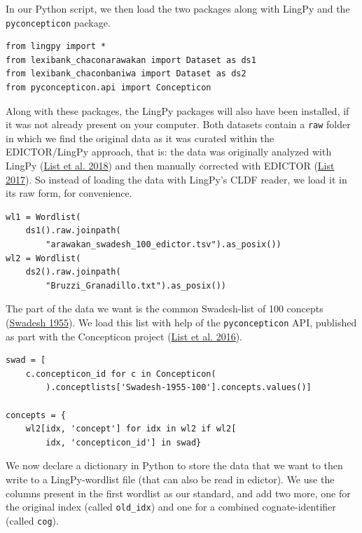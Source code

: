 \documentclass[
  a4paper,
  14pt,
  oneside,
  tablecaptionabove
]{scrbook}
\begin{document}
In our Python script, we then load the two packages along with LingPy
and the \lstinline!pyconcepticon! package.

\begin{lstlisting}
from lingpy import *
from lexibank_chaconarawakan import Dataset as ds1
from lexibank_chaconbaniwa import Dataset as ds2
from pyconcepticon.api import Concepticon
\end{lstlisting}

Along with these packages, the LingPy packages will also have been
installed, if it was not already present on your computer. Both datasets
contain a \lstinline!raw! folder in which we find the original data as
it was curated within the EDICTOR/LingPy approach, that is: the data was
originally analyzed with LingPy (\href{http://bibliography.lingpy.org?key=List2018i}{List et al. 2018})
and then manually corrected with EDICTOR (\href{http://bibliography.lingpy.org?key=List2017d}{List 2017}). So
instead of loading the data with LingPy's CLDF reader, we load it in its
raw form, for convenience.

\begin{lstlisting}
wl1 = Wordlist(
    ds1().raw.joinpath(
        "arawakan_swadesh_100_edictor.tsv").as_posix()) 
wl2 = Wordlist(
    ds2().raw.joinpath(
        "Bruzzi_Granadillo.txt").as_posix())
\end{lstlisting}

The part of the data we want is the common Swadesh-list of 100 concepts
(\href{http://bibliography.lingpy.org?key=Swadesh1955}{Swadesh 1955}).
We load this list with help of the \lstinline!pyconcepticon! API,
published as part with the Concepticon project (\href{http://bibliography.lingpy.org?key=List2016a}{List et al. 2016}).

\begin{lstlisting}
swad = [
    c.concepticon_id for c in Concepticon(
        ).conceptlists['Swadesh-1955-100'].concepts.values()]

concepts = {
    wl2[idx, 'concept'] for idx in wl2 if wl2[
        idx, 'concepticon_id'] in swad}
\end{lstlisting}

We now declare a dictionary in Python to store the data that we want to
then write to a LingPy-wordlist file (that can also be read in edictor).
We use the columns present in the first wordlist as our standard, and
add two more, one for the original index (called \lstinline!old_idx!)
and one for a combined cognate-identifier (called \lstinline!cog!).
\end{document}
